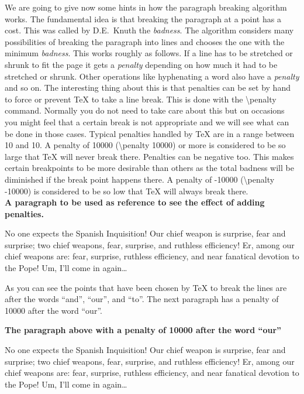 \documentclass[a4paper]{article}
\newcommand{\bs}[1]{{\rmfamily\color{blue}\textbackslash{}#1}}
\newenvironment{example}[1]{%
\vspace{10pt}
\noindent\textbf{#1}\sffamily\par\vspace{10pt}%
}
{%
\par\vspace{10pt}
}
\begin{document}
We are going to give now some hints in how the paragraph breaking algorithm works. The fundamental idea is that breaking the paragraph at a point has a cost. This was called by D.E.~Knuth the \emph{badness}. The algorithm considers many possibilities of breaking the paragraph into lines and chooses the one with the minimum \emph{badness}. This works roughly as follows. If a line has to be stretched or shrunk to fit the page it gets a \emph{penalty} depending on how much it had to be stretched or shrunk. Other operations like hyphenating a word also have a \emph{penalty} and so on. The interesting thing about this is that penalties can be set by hand to force or prevent \TeX{} to take a line break. This is done with the \bs{penalty} command. Normally you do not need to take care about this but on occasions you might feel that a certain break is not appropriate and we will see what can be done in those cases. Typical penalties handled by \TeX{} are in a range between 10 and 10. A penalty of 10000  (\bs{penalty 10000}) or more is considered to be so large that \TeX{} will never break there. Penalties can be negative too. This makes certain breakpoints to be more desirable than others as the total badness will be diminished if the break point happens there. A penalty of -10000 (\bs{penalty -10000}) is considered to be so low that \TeX{} will always break there.\\

\begin{example}{A paragraph to be used as reference to see the effect of adding penalties.}
No one expects the Spanish Inquisition! Our chief weapon is surprise, fear and surprise; two chief weapons, fear, surprise, and ruthless efficiency! Er, among our chief weapons are: fear, surprise, ruthless efficiency, and near fanatical devotion to the Pope! Um, I'll come in again\dots
\end{example}

\noindent As you can see the points that have been chosen by \TeX{} to break the lines are after the words ``and'', ``our'', and ``to''. The next paragraph has a penalty of 10000 after the word ``our''.

\begin{example}{The paragraph above with a penalty of 10000 after the word ``our''}
No one expects the Spanish Inquisition! Our chief weapon is surprise, fear and surprise; two chief weapons, fear, surprise, and ruthless efficiency! Er, among our{} chief weapons are: fear, surprise, ruthless efficiency, and near fanatical devotion to the Pope! Um, I'll come in again\dots
\end{example}
\end{document}
